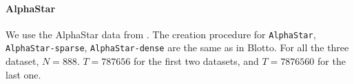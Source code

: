 \paragraph{AlphaStar} We use the AlphaStar data from \cite{czarnecki2020real}. The creation procedure for \texttt{AlphaStar}, \texttt{AlphaStar-sparse}, \texttt{AlphaStar-dense} are the same as in Blotto. For all the three dataset, $N=888$. $T=787656$ for the first two datasets, and $T=7876560$ for the last one.



